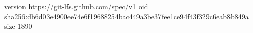 version https://git-lfs.github.com/spec/v1
oid sha256:db6d03e4900ee74e6f19688254bac449a3be37fee1ce94f43f329c6eab8b849a
size 1890
